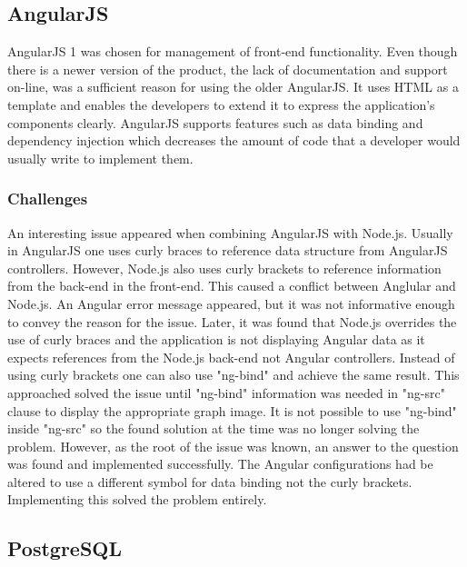 \documentclass{l4proj}
\begin{document}
\subsection{AngularJS}

AngularJS 1 was chosen for management of front-end functionality. Even though there is a newer version of the product, the lack of documentation and support on-line, was a sufficient reason for using the older AngularJS. It uses HTML as a template and enables the developers to extend it to express the application's components clearly. AngularJS supports features such as data binding and dependency injection which decreases the amount of code that a developer would usually write to implement them. 

\subsubsection{Challenges}

An interesting issue appeared when combining AngularJS with Node.js. Usually in AngularJS one uses curly braces to reference data structure from AngularJS controllers. However, Node.js also uses curly brackets to reference information from the back-end in the front-end. This caused a conflict between Anglular and Node.js. An Angular error message appeared, but it was not informative enough to convey the reason for the issue. Later, it was found that Node.js overrides the use of curly braces and the application is not displaying Angular data as it expects references from the Node.js back-end not Angular controllers. Instead of using curly brackets one can also use "ng-bind" and achieve the same result. This approached solved the issue until "ng-bind" information was needed in "ng-src" clause to display the appropriate graph image. It is not possible to use "ng-bind" inside "ng-src" so the found solution at the time was no longer solving the problem. However, as the root of the issue was known, an answer to the question was found and implemented successfully. The Angular configurations had be altered to use a different symbol for data binding not the curly brackets. Implementing this solved the problem entirely. 


\subsection{PostgreSQL}
\end{document}
